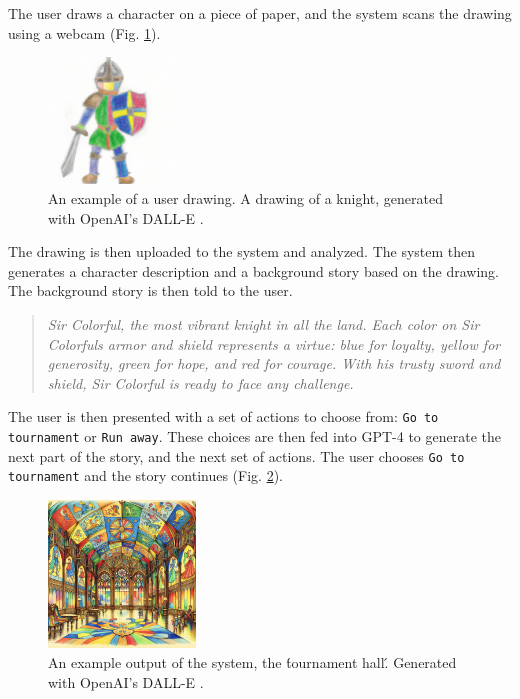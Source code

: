 \documentclass[submit,techrep,english]{ipsj}
\begin{document}
The user draws a character on a piece of paper, and the system scans the drawing using a webcam (Fig. \ref{fig:knight}).

\begin{figure}[h]
    \centering
    \includegraphics[width=0.3\textwidth]{figures/knight.png}
    \caption{An example of a user drawing. A drawing of a knight, generated with OpenAI's DALL-E \cite{21:dalle}.}
    \label{fig:knight}
\end{figure}

The drawing is then uploaded to the system and analyzed. The system then generates a character description and a background story based on the drawing. The background story is then told to the user.

\vspace{10pt} %

\begin{quote}
    \textit{Sir Colorful, the most vibrant knight in all the land. Each color on Sir Colorfuls armor and shield represents a virtue: blue for loyalty, yellow for generosity, green for hope, and red for courage. With his trusty sword and shield, Sir Colorful is ready to face any challenge.}
\end{quote}

\vspace{10pt} %

The user is then presented with a set of actions to choose from: \verb|Go to tournament| or \verb|Run away|. These choices are then fed into GPT-4 to generate the next part of the story, and the next set of actions. The user chooses \verb|Go to tournament| and the story continues (Fig. \ref{fig:tournament}).

\vspace{10pt} %

\begin{figure}[h]
    \centering
    \includegraphics[width=0.35\textwidth]{figures/tournament-hall.png}
    \caption{An example output of the system, the \'tournament hall\'. Generated with OpenAI's DALL-E \cite{21:dalle}.}
    \label{fig:tournament}
\end{figure}
\end{document}

